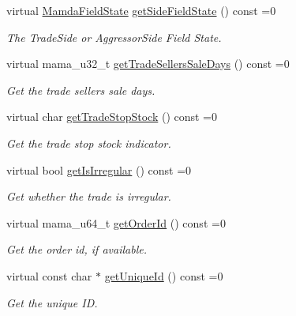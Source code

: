 \begin{CompactItemize}
\item 
virtual \hyperlink{namespaceWombat_93aac974f2ab713554fd12a1fa3b7d2a}{Mamda\-Field\-State} \hyperlink{classWombat_1_1MamdaTradeReport_1ff93d3fe09098e58d436b2f273c1030}{get\-Side\-Field\-State} () const =0
\begin{CompactList}\small\item\em The Trade\-Side or Aggressor\-Side Field State. \item\end{CompactList}\item 
virtual mama\_\-u32\_\-t \hyperlink{classWombat_1_1MamdaTradeReport_c9ed0e49599c96128f6be2a1e3390a33}{get\-Trade\-Sellers\-Sale\-Days} () const =0
\begin{CompactList}\small\item\em Get the trade sellers sale days. \item\end{CompactList}\item 
virtual char \hyperlink{classWombat_1_1MamdaTradeReport_5e97df5f0d331db50a07db5ebf9336da}{get\-Trade\-Stop\-Stock} () const =0
\begin{CompactList}\small\item\em Get the trade stop stock indicator. \item\end{CompactList}\item 
virtual bool \hyperlink{classWombat_1_1MamdaTradeReport_ae1e4952c9fb7450300864c44c715637}{get\-Is\-Irregular} () const =0
\begin{CompactList}\small\item\em Get whether the trade is irregular. \item\end{CompactList}\item 
virtual mama\_\-u64\_\-t \hyperlink{classWombat_1_1MamdaTradeReport_d4b975d041261a0dcca2e2413c25e72e}{get\-Order\-Id} () const =0
\begin{CompactList}\small\item\em Get the order id, if available. \item\end{CompactList}\item 
virtual const char $\ast$ \hyperlink{classWombat_1_1MamdaTradeReport_76e8e93ea2a7f53fb2b0287572dbf7ec}{get\-Unique\-Id} () const =0
\begin{CompactList}\small\item\em Get the unique ID. \item\end{CompactList}\item 

\end{CompactItemize}
